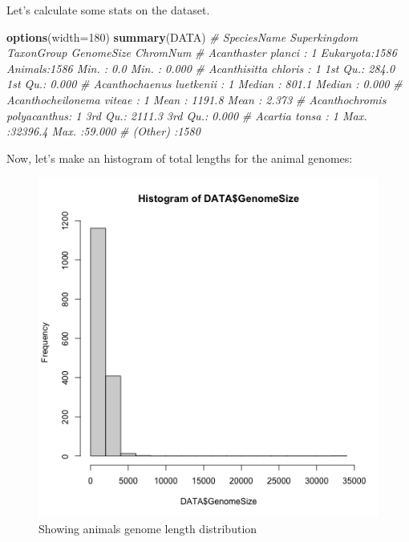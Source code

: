 \documentclass[10pt,a4paper,]{article}
\newenvironment{Shaded}{}{}
\newcommand{\CommentTok}[1]{\textcolor[rgb]{0.38,0.63,0.69}{\textit{#1}}}
\newcommand{\DataTypeTok}[1]{\textcolor[rgb]{0.56,0.13,0.00}{#1}}
\newcommand{\DecValTok}[1]{\textcolor[rgb]{0.25,0.63,0.44}{#1}}
\newcommand{\KeywordTok}[1]{\textcolor[rgb]{0.00,0.44,0.13}{\textbf{#1}}}
\newcommand{\NormalTok}[1]{#1}
\newcommand{\OperatorTok}[1]{\textcolor[rgb]{0.40,0.40,0.40}{#1}}
\newcommand{\StringTok}[1]{\textcolor[rgb]{0.25,0.44,0.63}{#1}}
\begin{document}
Let's calculate some stats on the dataset.

\begin{Shaded}
\begin{Highlighting}[]
\KeywordTok{options}\NormalTok{(}\DataTypeTok{width=}\DecValTok{180}\NormalTok{)}
\KeywordTok{summary}\NormalTok{(DATA)}
\CommentTok{#                       SpeciesName      Superkingdom    TaxonGroup     GenomeSize         ChromNum}
\CommentTok{#  Acanthaster planci         :   1   Eukaryota:1586   Animals:1586   Min.   :    0.0   Min.   : 0.000}
\CommentTok{#  Acanthisitta chloris       :   1                                   1st Qu.:  284.0   1st Qu.: 0.000}
\CommentTok{#  Acanthochaenus luetkenii   :   1                                   Median :  801.1   Median : 0.000}
\CommentTok{#  Acanthocheilonema viteae   :   1                                   Mean   : 1191.8   Mean   : 2.373}
\CommentTok{#  Acanthochromis polyacanthus:   1                                   3rd Qu.: 2111.3   3rd Qu.: 0.000}
\CommentTok{#  Acartia tonsa              :   1                                   Max.   :32396.4   Max.   :59.000}
\CommentTok{#  (Other)                    :1580}
\end{Highlighting}
\end{Shaded}

Now, let's make an histogram of total lengths for the animal genomes:

\begin{Shaded}
\end{Shaded}

\begin{figure}
\centering
\includegraphics{images/genome_length_animals.png}
\caption{Showing animals genome length distribution}
\end{figure}
\end{document}
